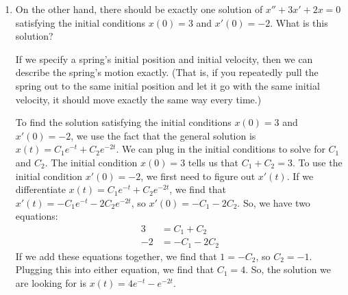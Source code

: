 \documentclass[main]{subfiles}
\begin{document}
\begin{enumerate}
\begin{enumerate}
    \begin{problem}[1in]
    The differential equation $x'' + 3x' + 2x = 0$ models a mass-spring
    system.  Explain, on purely physical grounds, why there
    are infinitely many solutions satisfying the initial condition $x(0)
    = 3$.  
    \end{problem}

    \begin{solution}
    We learned that $x'' + bx' + cx = 0$ models a spring if $b \geq 0$
    and $c > 0$, so $x'' + 3x' + 2x = 0$ is an example of a differential
    equation which models a spring.

    It makes sense that there are infinitely many solutions satisfying
    the initial condition $x(0) = 3$; after all, in terms of a spring,
    this initial condition is saying that the spring starts out being
    stretched by 3 units.  However, the way it moves will depend on what
    its initial velocity is.  
    \end{solution}

    \item
    \begin{problem}[3.5in]
    On the other hand, there should be exactly one solution of $x'' + 3x' + 2x = 0$ satisfying the initial conditions $x(0) = 3$ and $x'(0) = -2$.  What is this solution?
    \end{problem}

    \begin{solution}
    If we specify a spring's initial position and initial velocity, then
    we can describe the spring's motion exactly.  (That is, if you
    repeatedly pull the spring out to the same initial position and let
    it go with the same initial velocity, it should move exactly the
    same way every time.)  

    To find the solution satisfying the initial conditions $x(0) = 3$
    and $x'(0) = -2$, we use the fact that the general solution is $x(t)
    = C_1 e^{-t} + C_2 e^{-2t}$.  We can plug in the initial conditions
    to solve for $C_1$ and $C_2$.  The initial condition $x(0) = 3$
    tells us that $C_1 + C_2 = 3$.  To use the initial condition $x'(0)
    = -2$, we first need to figure out $x'(t)$.  If we differentiate
    $x(t) = C_1 e^{-t} + C_2 e^{-2t}$, we find that $x'(t) = - C_1
    e^{-t} - 2 C_2 e^{-2t}$, so $x'(0) = - C_1 - 2 C_2$.  So, we have
    two equations:
    \begin{align*}
    3 &= C_1 + C_2 \\
    -2 &= - C_1 - 2 C_2
    \end{align*}
    If we add these equations together, we find that $1 = - C_2$, so
    $C_2 = -1$.  Plugging this into either equation, we find that $C_1 =
    4$.  So, the solution we are looking for is $\boxed{x(t) = 4e^{-t} -
    e^{-2t}}$. 
    \end{solution}
    

\end{enumerate}
\end{enumerate}
\end{document}

